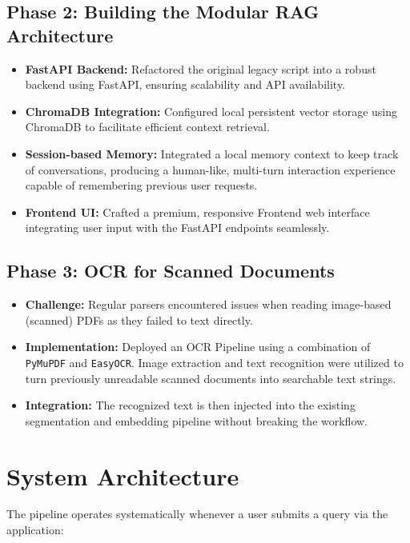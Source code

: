 \documentclass{article}
\begin{document}
\subsection{Phase 2: Building the Modular RAG Architecture}
\begin{itemize}
    \item \textbf{FastAPI Backend:} Refactored the original legacy script into a robust backend using FastAPI, ensuring scalability and API availability.
    \item \textbf{ChromaDB Integration:} Configured local persistent vector storage using ChromaDB to facilitate efficient context retrieval.
    \item \textbf{Session-based Memory:} Integrated a local memory context to keep track of conversations, producing a human-like, multi-turn interaction experience capable of remembering previous user requests.
    \item \textbf{Frontend UI:} Crafted a premium, responsive Frontend web interface integrating user input with the FastAPI endpoints seamlessly.
\end{itemize}

\subsection{Phase 3: OCR for Scanned Documents}
\begin{itemize}
    \item \textbf{Challenge:} Regular parsers encountered issues when reading image-based (scanned) PDFs as they failed to text directly.
    \item \textbf{Implementation:} Deployed an OCR Pipeline using a combination of \texttt{PyMuPDF} and \texttt{EasyOCR}. Image extraction and text recognition were utilized to turn previously unreadable scanned documents into searchable text strings.
    \item \textbf{Integration:} The recognized text is then injected into the existing segmentation and embedding pipeline without breaking the workflow.
\end{itemize}

\section{System Architecture}

The pipeline operates systematically whenever a user submits a query via the application:
\end{document}

